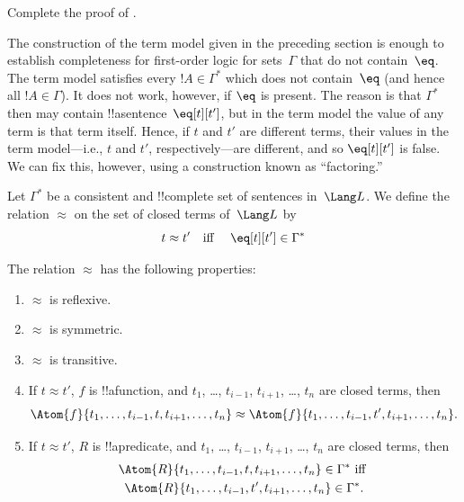 \begin{prob}
Complete the proof of .
\end{prob}








  


\begin{explain}
The construction of the term model given in the preceding section is
enough to establish completeness for first-order logic for
sets~$\Gamma$ that do not contain~$\eq$.  The term model satisfies
every $!A \in \Gamma^*$ which does not contain~$\eq$ (and hence all
$!A \in \Gamma$).  It does not work, however, if $\eq$ is present.
The reason is that $\Gamma^*$ then may contain
!!a{sentence}~$\eq[t][t']$, but in the term model the value of any
term is that term itself.  Hence, if $t$ and $t'$ are different terms,
their values in the term model---i.e., $t$ and $t'$,
respectively---are different, and so $\eq[t][t']$ is false.  We can
fix this, however, using a construction known as ``factoring.''
\end{explain}

\begin{defn}
  Let $\Gamma^*$ be a consistent and !!{complete} set of sentences
  in~$\Lang L$.  We define the relation $\approx$ on the set of closed
  terms of~$\Lang L$ by
  \[
  t \approx t' \text{\quad iff \quad} \eq[t][t'] \in \Gamma^*
  \]
\end{defn}

\begin{prop}
The relation $\approx$ has the following properties:
\begin{enumerate}
\item $\approx$ is reflexive.
\item $\approx$ is symmetric.
\item  $\approx$ is transitive.
\item If $t \approx t'$, $f$ is !!a{function}, and $t_1$, \dots,
  $t_{i-1}$, $t_{i+1}$, \dots, $t_n$ are closed terms, then
\[
\Atom{f}{t_1,\dots, t_{i-1}, t, t_{i+1}, \dots, t_n} \approx
\Atom{f}{t_1,\dots, t_{i-1}, t', t_{i+1}, \dots, t_n}.
\]
\item If $t \approx t'$, $R$ is !!a{predicate}, and $t_1$, \dots,
  $t_{i-1}$, $t_{i+1}$, \dots, $t_n$ are closed terms, then
\begin{multline*}
\Atom{R}{t_1,\dots, t_{i-1}, t, t_{i+1}, \dots, t_n} \in \Gamma^* \text{ iff } \\
\Atom{R}{t_1,\dots, t_{i-1}, t', t_{i+1}, \dots, t_n} \in \Gamma^*.
\end{multline*}
\end{enumerate}
\end{prop}

